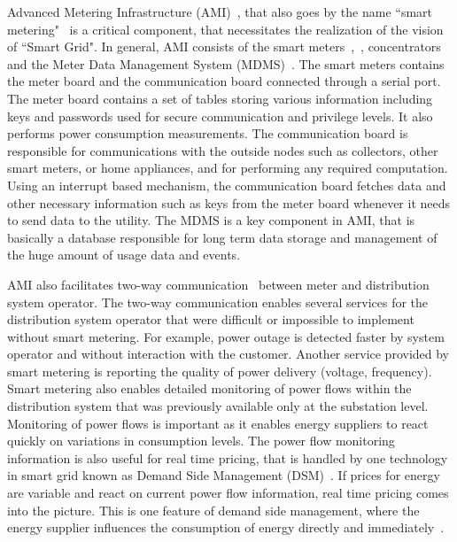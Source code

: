 Advanced Metering Infrastructure (AMI)~\cite{Erol-Kantarci15}, that also goes by the name ``smart metering"~\cite {YYan13} is a critical component, that necessitates the realization of the vision of ``Smart Grid". In general, AMI consists of the smart meters~\cite{Yan11},~\cite{Odelu16}, concentrators and the Meter Data Management System (MDMS)~\cite{US_report2}. The smart meters contains the meter board and the communication board connected through a serial port. The meter board contains a set of tables storing various information including keys and passwords used for secure communication and privilege levels. It also performs power consumption measurements. The communication board is responsible for communications with the outside nodes such as collectors, other smart meters, or home appliances, and for performing any required computation. Using an interrupt based mechanism, the communication board fetches data and other necessary information such as keys from the meter board whenever it needs to send data to the utility. The MDMS is a key component in AMI, that is basically a database responsible for long term data storage and management of the huge amount of usage data and events.
\par AMI also facilitates two-way communication~\cite{Mohassel14} between meter and distribution system operator. The two-way communication enables several services for the distribution system operator that were difficult or impossible to implement without smart metering. For example, power outage is detected faster by system operator and without interaction with the customer. Another service provided by smart metering is reporting the quality of power delivery (voltage, frequency). Smart metering also enables detailed monitoring of power flows within the distribution system that was previously available only at the substation level. Monitoring of power flows is important as it enables energy suppliers to react quickly on variations in consumption levels. The power flow monitoring information is also useful for real time pricing, that is handled by one technology in smart grid known as Demand Side Management (DSM)~\cite{Kabalci16}. If prices for energy are variable and react on current power flow information, real time pricing comes into the picture. This is one feature of demand side management, where the energy supplier influences the consumption of energy directly and immediately~\cite{Finster14}.

